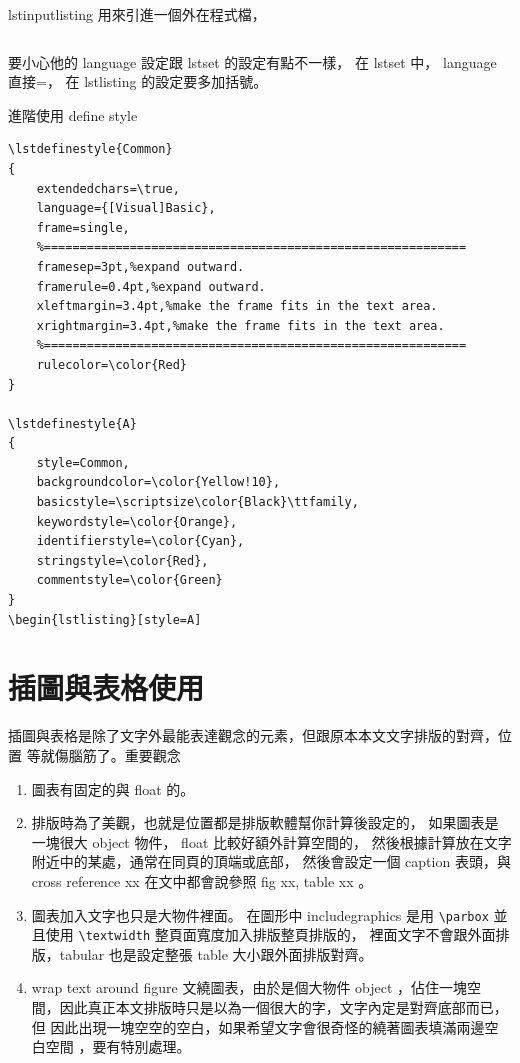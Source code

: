 lstinputlisting 用來引進一個外在程式檔，

\begin{verbatim}

\end{verbatim}
要小心他的 language 設定跟 lstset 的設定有點不一樣， 在 lstset 中，
language 直接=， 在 lstlisting 的設定要多加括號。

進階使用 define style

\begin{verbatim}
\lstdefinestyle{Common}
{
    extendedchars=\true,
    language={[Visual]Basic},
    frame=single,
    %===========================================================
    framesep=3pt,%expand outward.
    framerule=0.4pt,%expand outward.
    xleftmargin=3.4pt,%make the frame fits in the text area. 
    xrightmargin=3.4pt,%make the frame fits in the text area.
    %=========================================================== 
    rulecolor=\color{Red}
}

\lstdefinestyle{A}
{
    style=Common,
    backgroundcolor=\color{Yellow!10},
    basicstyle=\scriptsize\color{Black}\ttfamily,
    keywordstyle=\color{Orange},
    identifierstyle=\color{Cyan},
    stringstyle=\color{Red},
    commentstyle=\color{Green}
}
\begin{lstlisting}[style=A]
\end{verbatim}

\section{插圖與表格使用}
插圖與表格是除了文字外最能表達觀念的元素，但跟原本本文文字排版的對齊，位置
等就傷腦筋了。重要觀念
\begin{enumerate}
\item 圖表有固定的與 float 的。
\item 排版時為了美觀，也就是位置都是排版軟體幫你計算後設定的， 
如果圖表是一塊很大 object 物件， float 比較好額外計算空間的，
然後根據計算放在文字附近中的某處，通常在同頁的頂端或底部，
然後會設定一個 caption 表頭，與 cross reference xx
在文中都會說參照 fig xx, table xx 。
\item 圖表加入文字也只是大物件裡面。 在圖形中 includegraphics 是用
\verb=\parbox= 並且使用 \verb=\textwidth= 整頁面寬度加入排版整頁排版的，
裡面文字不會跟外面排版，tabular 也是設定整張 table 大小跟外面排版對齊。
\item wrap text around figure 文繞圖表，由於是個大物件 object ，佔住一塊空
間，因此真正本文排版時只是以為一個很大的字，文字內定是對齊底部而已，但
因此出現一塊空空的空白，如果希望文字會很奇怪的繞著圖表填滿兩邊空白空間
，要有特別處理。  
\end{enumerate}

